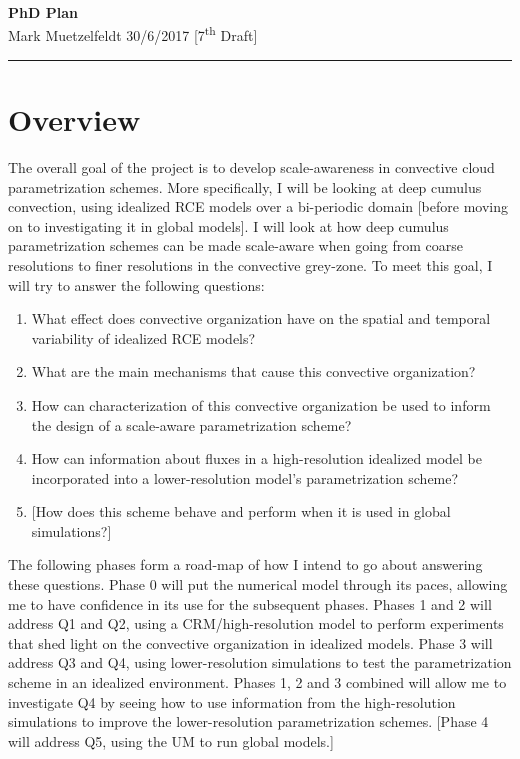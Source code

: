 \documentclass[11pt,a4paper]{article}
\newcommand{\ts}{\textsuperscript}
\begin{document}
\begin{center}
    \Large{\textbf{PhD Plan}}\\[0.15cm]
    \large{Mark Muetzelfeldt 30/6/2017 [7\ts{th} Draft]}\\ 
    \rule{\textwidth}{0.2mm}
\end{center}

\section*{Overview}

The overall goal of the project is to develop scale-awareness in convective cloud parametrization schemes. More specifically, I will be looking at deep cumulus convection, using idealized RCE models over a bi-periodic domain [before moving on to investigating it in global models]. I will look at how deep cumulus parametrization schemes can be made scale-aware when going from coarse resolutions to finer resolutions in the convective grey-zone. To meet this goal, I will try to answer the following questions:

\begin{enumerate}
    \item What effect does convective organization have on the spatial and temporal variability of idealized RCE models?
    \item What are the main mechanisms that cause this convective organization?
    \item How can characterization of this convective organization be used to inform the design of a scale-aware parametrization scheme?
    \item How can information about fluxes in a high-resolution idealized model be incorporated into a lower-resolution model's parametrization scheme?
    \item  {[How does this scheme behave and perform when it is used in global simulations?]}
\end{enumerate}

The following phases form a road-map of how I intend to go about answering these questions. Phase 0 will put the numerical model through its paces, allowing me to have confidence in its use for the subsequent phases. Phases 1 and 2 will address Q1 and Q2, using a CRM/high-resolution model to perform experiments that shed light on the convective organization in idealized models. Phase 3 will address Q3 and Q4, using lower-resolution simulations to test the parametrization scheme in an idealized environment. Phases 1, 2 and 3 combined will allow me to investigate Q4 by seeing how to use information from the high-resolution simulations to improve the lower-resolution parametrization schemes. [Phase 4 will address Q5, using the UM to run global models.]
\end{document}
